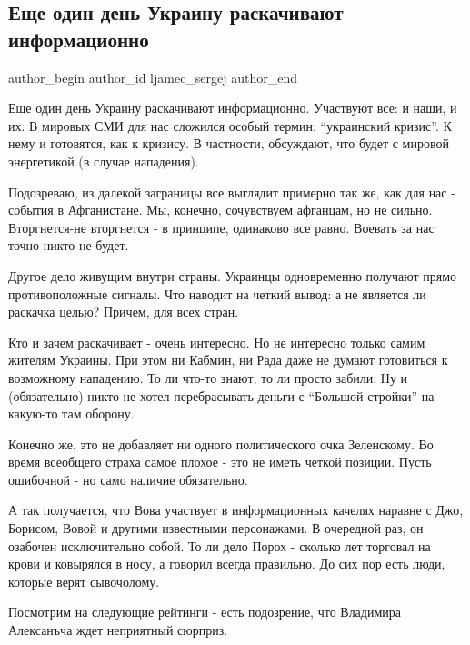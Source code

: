  
 
 
 
 
 
\subsection{Еще один день Украину раскачивают информационно}
\label{sec:31_01_2022.fb.ljamec_sergej.1.ukraina_raskachka}
 
\ifcmt
 author_begin
   author_id ljamec_sergej
 author_end
\fi

Еще один день Украину раскачивают информационно. Участвуют все: и наши, и их. В
мировых СМИ для нас сложился особый термин: \enquote{украинский кризис}. К нему и
готовятся, как к кризису. В частности, обсуждают, что будет с мировой
энергетикой (в случае нападения).


Подозреваю, из далекой заграницы все выглядит примерно так же, как для нас -
события в Афганистане. Мы, конечно, сочувствуем афганцам, но не сильно.
Вторгнется-не вторгнется - в принципе, одинаково все равно. Воевать за нас
точно никто не будет.

Другое дело живущим внутри страны. Украинцы одновременно получают прямо
противоположные сигналы. Что наводит на четкий вывод: а не является ли раскачка
целью? Причем, для всех стран.


Кто и зачем раскачивает - очень интересно. Но не интересно только самим жителям
Украины. При этом ни Кабмин, ни Рада даже не думают готовиться к возможному
нападению. То ли что-то знают, то ли просто забили. Ну и (обязательно) никто не
хотел перебрасывать деньги с \enquote{Большой стройки} на какую-то там оборону.

Конечно же, это не добавляет ни одного политического очка Зеленскому. Во время
всеобщего страха самое плохое - это не иметь четкой позиции. Пусть ошибочной -
но само наличие обязательно.

А так получается, что Вова участвует в информационных качелях наравне с Джо,
Борисом, Вовой и другими известными персонажами. В очередной раз, он озабочен
исключительно собой. То ли дело Порох - сколько лет торговал на крови и
ковырялся в носу, а говорил всегда правильно. До сих пор есть люди, которые
верят сывочолому.

Посмотрим на следующие рейтинги - есть подозрение, что Владимира Алексанъча
ждет неприятный сюрприз.
